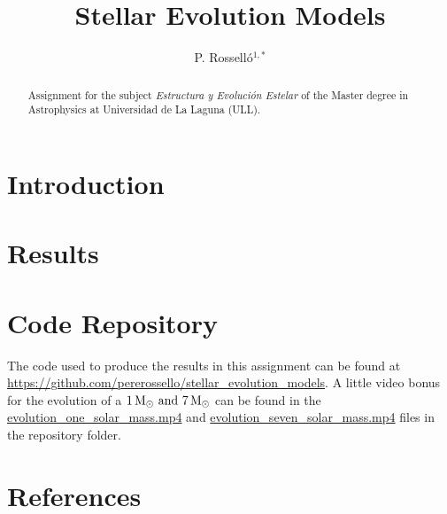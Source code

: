 \documentclass{anotherarticlestyle}
\title{Stellar Evolution Models}
\author{P. Rosselló$^{1,*}$}
\begin{document}
\maketitle

\begin{strip}
    \begin{abstract}
        {\small
            Assignment for the subject \textit{Estructura y Evolución Estelar} of the Master degree in Astrophysics at Universidad de La Laguna (ULL).
        }
    \end{abstract}
\end{strip}




\section{Introduction}


\section{Results}

\newpage
\section{Code Repository}
The code used to produce the results in this assignment can be found at \url{https://github.com/pererossello/stellar_evolution_models}. A little video bonus for the evolution of a $1 \, {\rm M}_\odot \ \text{and} \ 7 \,  {\rm M}_\odot$ can be found in the \url{evolution_one_solar_mass.mp4} and \url{evolution_seven_solar_mass.mp4} files in the repository folder.

\newpage
\pagebreak
\onecolumn
\twocolumn


\section*{References}




% 




% 

% 
\end{document}
